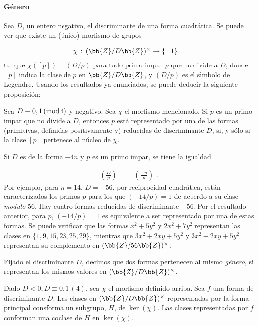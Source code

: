 \paragraph{G\'{e}nero}
Sea $D$, un entero negativo, el discriminante de una forma
cuadr\'{a}tica. Se puede ver que existe un (\'{u}nico)
morfismo de grupos

\begin{align*}
\chi & \,:\,(\bb{Z}/D\bb{Z})^{\times}\rightarrow
\left\lbrace\pm 1\right\rbrace
\end{align*}
tal que $\chi([p])=(D/p)$ para todo primo impar $p$ que no divide a
$D$, donde $[p]$ indica la clase de $p$ en $\bb{Z}/D\bb{Z}$, y
$(D/p)$ es el s\'{\i}mbolo de Legendre. Usando los resultados
ya enunciados, se puede deducir la siguiente proposici\'{o}n:

\begin{definicionesPropoRepDePrimosPorFormas}
Sea $D\equiv 0,1\,(\rm{mod}\,4)$ y negativo. Sea $\chi$ el morfismo
mencionado. Si $p$ es un primo impar que no divide a $D$, entonces
$p$ est\'{a} representado por una de las formas
(primitivas, definidas positivamente y) reducidas de discriminante $D$,
si, y s\'{o}lo si la clase $[p]$ pertenece al n\'{u}cleo de $\chi$.
\end{definicionesPropoRepDePrimosPorFormas}

Si $D$ es de la forma $-4n$ y $p$ es un primo impar, se tiene la
igualdad

\begin{align*}
\left( \frac{D}{p} \right) & \,=\,\left( \frac{-n}{p} \right)
\text{ .}
\end{align*}
Por ejemplo, para $n=14$, $D=-56$, por reciprocidad cuadr\'{a}tica,
est\'{a}n caracterizados los primos $p$ para los que $(-14/p)=1$
de acuerdo a su clase \textit{modulo} $56$. Hay cuatro formas
reducidas de discriminante $-56$. Por el resultado anterior, para $p$,
$(-14/p)=1$ es equivalente a ser representado por una de estas formas.
Se puede verificar que las formas $x^{2}+5y^{2}$ y $2x^{2}+7y^{2}$
representan las clases en $\{1,9,15,23,25,29\}$, mientras que
$3x^{2}+2xy+5y^{2}$ y $3x^{2}-2xy+5y^{2}$ representan su complemento
en $(\bb{Z}/56\bb{Z})^{\times}$.

Fijado el discriminante $D$, decimos que dos formas pertenecen al
mismo \emph{g\'{e}nero}, si representan los mismos valores en
$(\bb{Z}/D\bb{Z})^{\times}$.

\begin{definicionesLemaClasesRepresentadas}
Dado $D<0,D\equiv 0,1\,(4)$, sea $\chi$ el morfismo definido arriba.
Sea $f$ una forma de discriminante $D$. Las clases en
$(\bb{Z}/D\bb{Z})^{\times}$ representadas por la forma principal
consforma un subgrupo, $H$, de $\ker(\chi)$. Las clases representadas
por $f$ conforman una coclase de $H$ en $\ker(\chi)$.
\end{definicionesLemaClasesRepresentadas}


